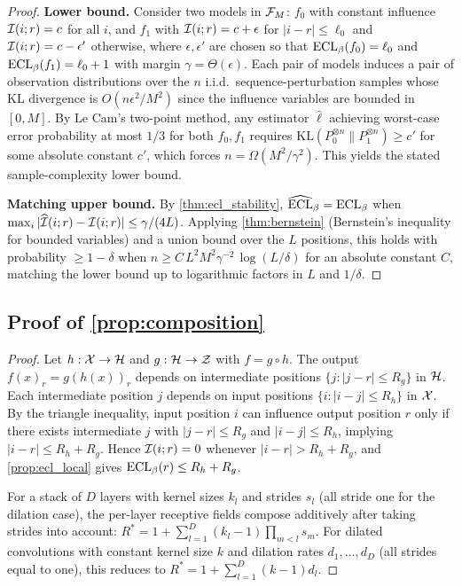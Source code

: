 \begin{proof}
\textbf{Lower bound.} Consider two models in $\mathcal{F}_M$: $f_0$ with constant influence $\mathcal{I}(i;r) = c$ for all $i$, and $f_1$ with $\mathcal{I}(i;r) = c + \epsilon$ for $|i-r| \le \ell_0$ and $\mathcal{I}(i;r) = c - \epsilon'$ otherwise, where $\epsilon, \epsilon'$ are chosen so that $\mathrm{ECL}_\beta(f_0) = \ell_0$ and $\mathrm{ECL}_\beta(f_1) = \ell_0 + 1$ with margin $\gamma = \Theta(\epsilon)$. Each pair of models induces a pair of observation distributions over the $n$ i.i.d.\ sequence-perturbation samples whose KL divergence is $O(n\epsilon^2/M^2)$ since the influence variables are bounded in $[0,M]$. By Le Cam's two-point method, any estimator $\hat{\ell}$ achieving worst-case error probability at most $1/3$ for both $f_0, f_1$ requires $\mathrm{KL}(P_0^{\otimes n} \| P_1^{\otimes n}) \ge c'$ for some absolute constant $c'$, which forces $n = \Omega(M^2/\gamma^2)$. This yields the stated sample-complexity lower bound.

\textbf{Matching upper bound.} By \cref{thm:ecl_stability}, $\widehat{\mathrm{ECL}}_\beta = \mathrm{ECL}_\beta$ when $\max_i |\widehat{\mathcal{I}}(i;r) - \mathcal{I}(i;r)| \le \gamma/(4L)$. Applying \cref{thm:bernstein} (Bernstein's inequality for bounded variables) and a union bound over the $L$ positions, this holds with probability $\ge 1-\delta$ when $n \ge C\,L^2 M^2 \gamma^{-2}\,\log(L/\delta)$ for an absolute constant $C$, matching the lower bound up to logarithmic factors in $L$ and $1/\delta$.
\end{proof}

\subsection{Proof of \texorpdfstring{\cref{prop:composition}}{Proposition: Compositional Bound}}

\begin{proof}
Let $h:\mathcal{X} \to \mathcal{H}$ and $g:\mathcal{H} \to \mathcal{Z}$ with $f = g \circ h$. The output $f(x)_r = g(h(x))_r$ depends on intermediate positions $\{j : |j - r| \le R_g\}$ in $\mathcal{H}$. Each intermediate position $j$ depends on input positions $\{i : |i - j| \le R_h\}$ in $\mathcal{X}$. By the triangle inequality, input position $i$ can influence output position $r$ only if there exists intermediate $j$ with $|j-r| \le R_g$ and $|i-j| \le R_h$, implying $|i-r| \le R_h + R_g$. Hence $\mathcal{I}(i;r) = 0$ whenever $|i-r| > R_h + R_g$, and \cref{prop:ecl_local} gives $\mathrm{ECL}_\beta(r) \le R_h + R_g$.

For a stack of $D$ layers with kernel sizes $k_l$ and strides $s_l$ (all stride one for the dilation case), the per-layer receptive fields compose additively after taking strides into account: $R^* = 1 + \sum_{l=1}^D (k_l - 1) \prod_{m<l} s_m$. For dilated convolutions with constant kernel size $k$ and dilation rates $d_1, \dots, d_D$ (all strides equal to one), this reduces to $R^* = 1 + \sum_{l=1}^D (k-1) d_l$.
\end{proof}
